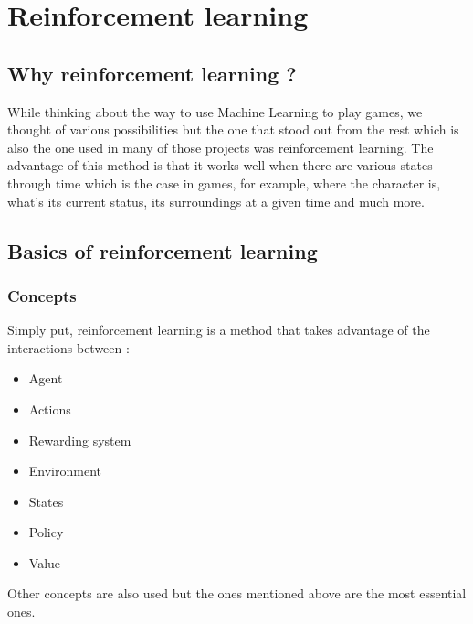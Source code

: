 \documentclass[a4paper,12pt,calibri,oneside,openany]{book}
\theoremstyle{break}
\begin{document}

\frontmatter



\tableofcontents

\mainmatter
\pagestyle{fancy}
\chapter{Reinforcement learning}
\section{Why reinforcement learning ?}
\qquad While thinking about the way to use Machine Learning to play games, we thought of various possibilities but the one that stood out from the rest which is also the one used in many of those projects was reinforcement learning. The advantage of this method is that it works well when there are various states through time which is the case in games, for example, where the character is, what's its current status, its surroundings at a given time and much more. 
\section{Basics of reinforcement learning}
\subsection{Concepts}
\qquad Simply put, reinforcement learning is a method that takes advantage of the interactions between : 
\begin{itemize}
	\item Agent
	\item Actions
	\item Rewarding system
	\item Environment
	\item States
	\item Policy
	\item Value
\end{itemize}

Other concepts are also used but the ones mentioned above are the most essential ones.\\
\end{document}
